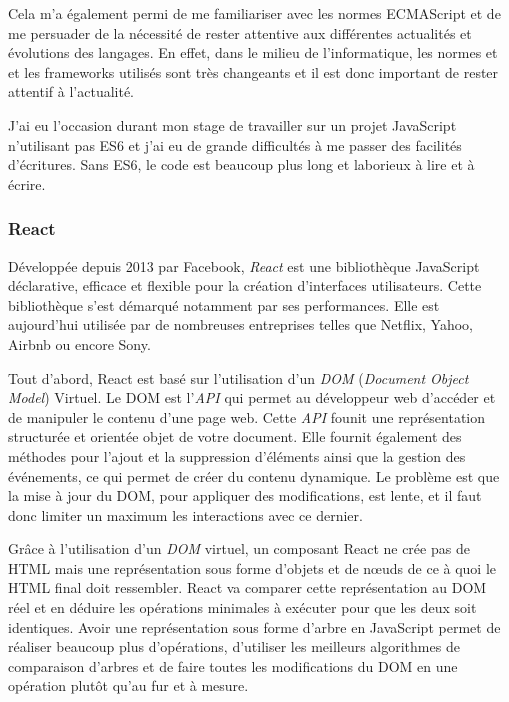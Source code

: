 \documentclass[12pt,a4paper]{article}
\begin{document}
  \bigskip

  Cela m'a également permi de me familiariser avec les normes ECMAScript
  et de me persuader de la nécessité de rester attentive aux différentes
  actualités et évolutions des langages. En effet, dans le milieu de
  l'informatique, les normes et et les frameworks utilisés sont très
  changeants et il est donc important de rester attentif à l'actualité.

  \bigskip

  J'ai eu l'occasion durant mon stage de travailler sur un projet
  JavaScript n'utilisant pas ES6 et j'ai eu de grande difficultés à me
  passer des facilités d'écritures. Sans ES6, le code est beaucoup plus
  long et laborieux à lire et à écrire.

  \bigskip

  \subsubsection{React}\label{react}

  \bigskip

  Développée depuis 2013 par Facebook, \emph{React} est une bibliothèque
  JavaScript déclarative, efficace et flexible pour la création
  d'interfaces utilisateurs. Cette bibliothèque s'est démarqué notamment
  par ses performances. Elle est aujourd'hui utilisée par de nombreuses
  entreprises telles que Netflix, Yahoo, Airbnb ou encore Sony.

  \bigskip

  Tout d'abord, React est basé sur l'utilisation d'un \emph{DOM}
  (\emph{Document Object Model}) Virtuel. Le DOM est l'\emph{API} qui
  permet au développeur web d'accéder et de manipuler le contenu d'une
  page web. Cette \emph{API} founit une représentation structurée et
  orientée objet de votre document. Elle fournit également des méthodes
  pour l'ajout et la suppression d'éléments ainsi que la gestion des
  événements, ce qui permet de créer du contenu dynamique. Le problème est
  que la mise à jour du DOM, pour appliquer des modifications, est lente,
  et il faut donc limiter un maximum les interactions avec ce dernier.

  \bigskip

  Grâce à l'utilisation d'un \emph{DOM} virtuel, un composant React ne
  crée pas de HTML mais une représentation sous forme d'objets et de nœuds
  de ce à quoi le HTML final doit ressembler. React va comparer cette
  représentation au DOM réel et en déduire les opérations minimales à
  exécuter pour que les deux soit identiques. Avoir une représentation
  sous forme d'arbre en JavaScript permet de réaliser beaucoup plus
  d'opérations, d'utiliser les meilleurs algorithmes de comparaison
  d'arbres et de faire toutes les modifications du DOM en une opération
  plutôt qu'au fur et à mesure.
\end{document}
